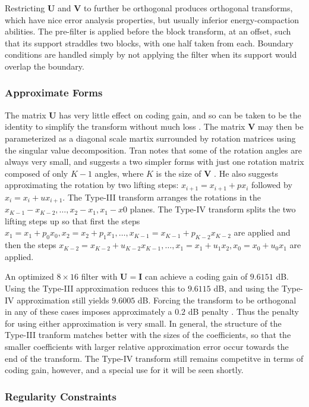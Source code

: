 \documentclass[11pt,letterpaper]{article}
\begin{document}
Restricting ${\mathbf U}$ and ${\mathbf V}$ to further be orthogonal produces
 orthogonal transforms, which have nice error analysis properties, but usually
 inferior energy-compaction abilities.
The pre-filter is applied before the block transform, at an offset, such that
 its support straddles two blocks, with one half taken from each.
Boundary conditions are handled simply by not applying the filter when its
 support would overlap the boundary.

\subsubsection{Approximate Forms}

The matrix ${\mathbf U}$ has very little effect on coding gain, and so can be
 taken to be the identity to simplify the transform without much loss
 \cite{Tra01a}.
The matrix ${\mathbf V}$ may then be parameterized as a diagonal scale martix
 surrounded by rotation matrices using the singular value decomposition.
Tran notes that some of the rotation angles are always very small, and suggests a
 two simpler forms with just one rotation matrix composed of only $K-1$ angles,
 where $K$ is the size of ${\mathbf V}$ \cite{Tra01a}.
He also suggests approximating the rotation by two lifting steps:
 $x_{i+1}=x_{i+1}+px_i$ followed by $x_i=x_i+ux_{i+1}$.
The Type-III transform arranges the rotations in the $x_{K-1}-x_{K-2},\ldots,
 x_2-x_1,x_1-x0$ planes.
The Type-IV transform splits the two lifting steps up so that first the steps
 $x_1=x_1+p_0x_0,x_2=x_2+p_1x_1,\ldots,x_{K-1}=x_{K-1}+p_{K-2}x_{K-2}$ are
 applied and then the steps $x_{K-2}=x_{K-2}+u_{K-2}x_{K-1},\ldots,
 x_1=x_1+u_1x_2,x_0=x_0+u_0x_1$ are applied.

An optimized $8\times 16$ filter with ${\mathbf U}={\mathbf I}$ can achieve a
 coding gain of $9.6151$ dB.
Using the Type-III approximation reduces this to $9.6115$ dB, and using the
 Type-IV approximation still yields $9.6005$ dB.
Forcing the transform to be orthogonal in any of these cases imposes
 approximately a $0.2$ dB penalty \cite{Tra01b}.
Thus the penalty for using either approximation is very small.
In general, the structure of the Type-III tranform matches better with the
 sizes of the coefficients, so that the smaller coefficients with larger
 relative approximation error occur towards the end of the transform.
The Type-IV transform still remains competitve in terms of coding gain,
 however, and a special use for it will be seen shortly.

\subsubsection{Regularity Constraints}
\end{document}
